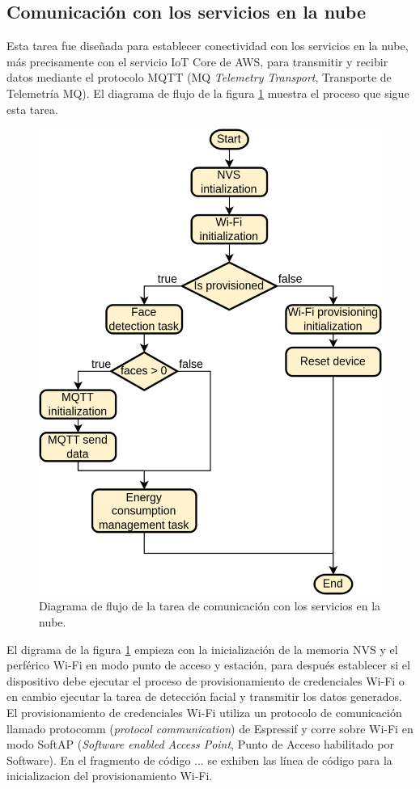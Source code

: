 \subsection{Comunicación con los servicios en la nube}
Esta tarea fue diseñada para establecer conectividad con los servicios en la nube, más precisamente con el servicio IoT Core de AWS, para transmitir y recibir datos mediante el protocolo MQTT (MQ \textit{Telemetry Transport}, Transporte de Telemetría MQ). El diagrama de flujo de la figura \ref{fig:fw_comm_flow} muestra el proceso que sigue esta tarea.

\begin{figure}[h]
	\centering
	\includegraphics[scale=0.22]{./Figures/fw_comm_flow.png}
	\caption{Diagrama de flujo de la tarea de comunicación con los servicios en la nube.}
	\label{fig:fw_comm_flow}
\end{figure}

El digrama de la figura \ref{fig:fw_comm_flow} empieza con la inicialización de la memoria NVS y el perférico Wi-Fi en modo punto de acceso y estación, para después establecer si el dispositivo debe ejecutar el proceso de provisionamiento de credenciales Wi-Fi o en cambio ejecutar la tarea de detección facial y transmitir los datos generados. El provisionamiento de credenciales Wi-Fi utiliza un protocolo de comunicación llamado protocomm (\textit{protocol communication}) de Espressif \cite{protocomm_doc} y corre sobre Wi-Fi en modo SoftAP (\textit{Software enabled Access Point}, Punto de Acceso habilitado por Software). En el fragmento de código ... se exhiben las línea de código para la inicializacion del provisionamiento Wi-Fi.

